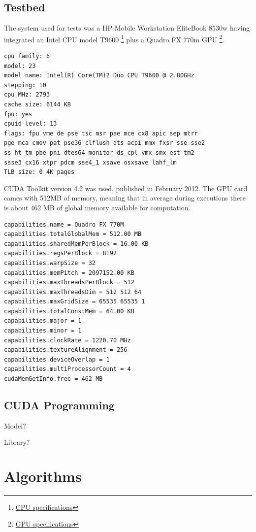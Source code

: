 \documentclass{llncs}
\begin{document}
\subsection{Testbed}

The system used for tests was a HP Mobile Workstation EliteBook 8530w having integrated
an Intel CPU model T9600 \footnote{\href{http://ark.intel.com/products/35563}{CPU specifications}}
plus a Quadro FX 770m GPU \footnote{\href{http://www.nvidia.com/docs/IO/57883/PO\_Quadro\_FAM\_Mar08\_FINAL\_LowRes.pdf}{GPU specifications}}.

\begin{verbatim}
cpu family: 6
model: 23
model name: Intel(R) Core(TM)2 Duo CPU T9600 @ 2.80GHz
stepping: 10
cpu MHz: 2793
cache size: 6144 KB
fpu: yes
cpuid level: 13
flags: fpu vme de pse tsc msr pae mce cx8 apic sep mtrr
pge mca cmov pat pse36 clflush dts acpi mmx fxsr sse sse2
ss ht tm pbe pni dtes64 monitor ds_cpl vmx smx est tm2
ssse3 cx16 xtpr pdcm sse4_1 xsave osxsave lahf_lm
TLB size: 0 4K pages
\end{verbatim}

CUDA Toolkit version 4.2 was used, published in February 2012.
The GPU card cames with 512MB of memory, meaning that in average during executions
there is about 462 MB of global memory available for computation.

\begin{verbatim}
capabilities.name = Quadro FX 770M
capabilities.totalGlobalMem = 512.00 MB
capabilities.sharedMemPerBlock = 16.00 KB
capabilities.regsPerBlock = 8192
capabilities.warpSize = 32
capabilities.memPitch = 2097152.00 KB
capabilities.maxThreadsPerBlock = 512
capabilities.maxThreadsDim = 512 512 64
capabilities.maxGridSize = 65535 65535 1
capabilities.totalConstMem = 64.00 KB
capabilities.major = 1
capabilities.minor = 1
capabilities.clockRate = 1220.70 MHz
capabilities.textureAlignment = 256
capabilities.deviceOverlap = 1
capabilities.multiProcessorCount = 4
cudaMemGetInfo.free = 462 MB
\end{verbatim}

\subsection{CUDA Programming}

Model?

Library? 

\section{Algorithms}
\end{document}
